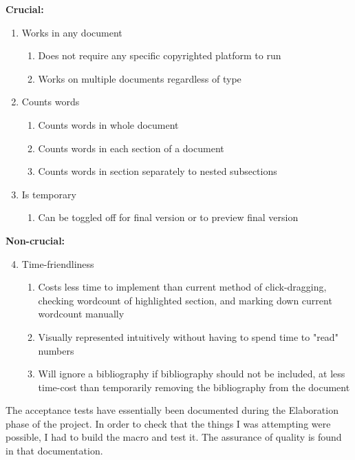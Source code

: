 \documentclass[10pt]{article}
\begin{document}
\textbf{Crucial:}
\begin{enumerate}
    \item Works in any document
    \begin{enumerate}
        \item Does not require any specific copyrighted platform to run
        \item Works on multiple documents regardless of type
    \end{enumerate}
    \item Counts words
    \begin{enumerate}
        \item Counts words in whole document
        \item Counts words in each section of a document
        \item Counts words in section separately to nested subsections
    \end{enumerate}
    \item Is temporary
    \begin{enumerate}
        \item Can be toggled off for final version or to preview final version
    \end{enumerate}
\end{enumerate}

\textbf{Non-crucial:}
\begin{enumerate}\setcounter{enumi}{3}
    \item Time-friendliness
    \begin{enumerate}
        \item Costs less time to implement than current method of click-dragging, checking wordcount of highlighted section, and marking down current wordcount manually
        \item Visually represented intuitively without having to spend time to "read" numbers
        \item Will ignore a bibliography if bibliography should not be included, at less time-cost than temporarily removing the bibliography from the document
    \end{enumerate}
\end{enumerate}

 
The acceptance tests have essentially been documented during the Elaboration phase of the project. In order to check that the things I was attempting were possible, I had to build the macro and test it. The assurance of quality is found in that documentation.
\end{document}
